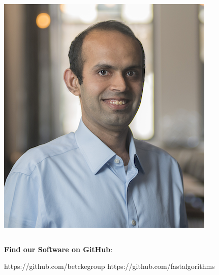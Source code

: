\begin{frame}
\begin{columns}
\begin{column}{0.5\textwidth}
\begin{center}
\begin{minipage}{0.48\linewidth}
                    \centering
                \end{minipage}%
                 \begin{minipage}{0.48\linewidth}
                    \includegraphics[height=1.2\linewidth]{assets/manas.png}
                    \centering
                \end{minipage}%
            \end{center}
        \end{column}
    \end{columns}
    
    \textbf{Find our Software on GitHub}:

    https://github.com/betckegroup
    https://github.com/fastalgorithms
\end{frame}
